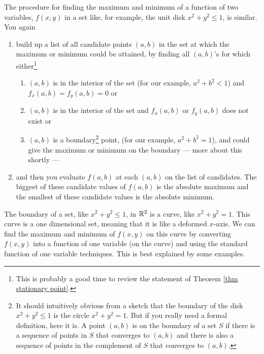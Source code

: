 The procedure for finding the maximum and minimum of a function of two
variables, $f(x,y)$ in a set like, for example, the unit disk $x^2+y^2\le 1$, 
is similar.  You again
\begin{enumerate}
\item build up a list of all candidate points $(a,b)$ in the set at which 
the maximum or minimum could be attained, by finding all $(a,b)$'s for which
either\footnote{This is probably a good time to review the statement of
Theorem \ref{thm stationary point}.}
   \begin{enumerate}
   \item $(a,b)$ is in the interior of the set (for our example, $a^2+b^2<1$)
    and $f_x(a,b)=f_y(a,b)=0$ or
   \item $(a,b)$ is in the interior of the set and  $f_x(a,b)$ or $f_y(a,b)$
        does not exist or
   \item $(a,b)$ is a boundary\footnote{It should intuitively obvious 
       from a sketch that the boundary of the disk $x^2+y^2\le 1$ is 
       the circle $x^2+y^2=1$.
       But if you really need a formal definition, here it is. A point
       $(a,b)$ is on the boundary of a set $S$ if there is a sequence of
       points in $S$ that converges to $(a,b)$ and there is also a sequence
       of points in the  complement of $S$ that converges to $(a,b)$.} 
     point, (for our example, $a^2+b^2=1$), and 
        could give the maximum or minimum on the boundary --- 
        more about this shortly ---
   \end{enumerate}
\item and then you evaluate $f(a,b)$ at each $(a,b)$ on the list of candidates.
   The biggest of these candidate values of $f(a,b)$ is the absolute maximum 
   and the smallest of these candidate values is the absolute minimum.
\end{enumerate}
The boundary of a set, like $x^2+y^2\le 1$, in $\mathbb{R}^2$ is a curve,
like $x^2+y^2=1$. This curve is a one dimensional set, meaning that it
is like a deformed $x$-axis. We can find the maximum and minimum of $f(x,y)$
on this curve by converting $f(x,y)$ into a function of one variable (on the
curve) and using the standard function of one variable techniques. This is
best explained by some examples.

